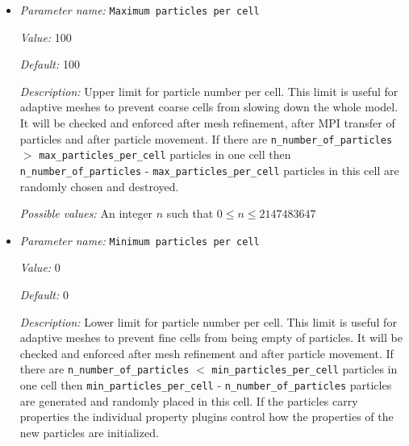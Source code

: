 \begin{itemize}
{\it Value:} repartition


{\it Default:} repartition


{\it Description:} Strategy that is used to balance the computational load across processors for adaptive meshes.


{\it Possible values:} A comma-separated list of any of none, remove particles, add particles, remove and add particles, repartition
\item {\it Parameter name:} {\tt Maximum particles per cell}
\label{parameters:Postprocess/Particles/Maximum particles per cell}
\label{parameters:Postprocess/Particles/Maximum_20particles_20per_20cell}


{\it Value:} 100


{\it Default:} 100


{\it Description:} Upper limit for particle number per cell. This limit is useful for adaptive meshes to prevent coarse cells from slowing down the whole model. It will be checked and enforced after mesh refinement, after MPI transfer of particles and after particle movement. If there are \texttt{n\_number\_of\_particles} $>$ \texttt{max\_particles\_per\_cell} particles in one cell then \texttt{n\_number\_of\_particles} - \texttt{max\_particles\_per\_cell} particles in this cell are randomly chosen and destroyed.


{\it Possible values:} An integer $n$ such that $0\leq n \leq 2147483647$
\item {\it Parameter name:} {\tt Minimum particles per cell}
\label{parameters:Postprocess/Particles/Minimum particles per cell}
\label{parameters:Postprocess/Particles/Minimum_20particles_20per_20cell}


{\it Value:} 0


{\it Default:} 0


{\it Description:} Lower limit for particle number per cell. This limit is useful for adaptive meshes to prevent fine cells from being empty of particles. It will be checked and enforced after mesh refinement and after particle movement. If there are \texttt{n\_number\_of\_particles} $<$ \texttt{min\_particles\_per\_cell} particles in one cell then \texttt{min\_particles\_per\_cell} - \texttt{n\_number\_of\_particles} particles are generated and randomly placed in this cell. If the particles carry properties the individual property plugins control how the properties of the new particles are initialized.



\end{itemize}
